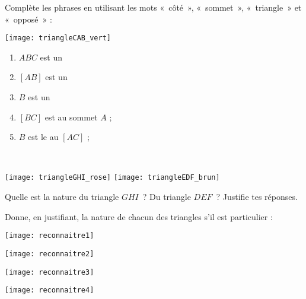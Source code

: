 

\begin{exercice}
Complète les phrases en utilisant les mots « côté », « sommet », « triangle » et « opposé » : \\[-3em]
\begin{minipage}[c]{0.26\linewidth}
 \vspace{1.5cm}
 \texttt{[image: triangleCAB\_vert]}
 \end{minipage} \hfill%
 \begin{minipage}[t]{0.68\linewidth}
  \begin{enumerate}
   \item $ABC$ est un \dotfill
   \item $[AB]$ est un  \dotfill
   \item $B$ est un  \dotfill
   \item $[BC]$ est  \dotfill au sommet $A$ ;
   \item $B$ est le  \dotfill au  \dotfill $[AC]$ ;
   \end{enumerate}
 \end{minipage} \\
\end{exercice}


\begin{exercice}
 \begin{center} \texttt{[image: triangleGHI\_rose]} \qquad \texttt{[image: triangleEDF\_brun]} \end{center}
 Quelle est la nature du triangle $GHI$ ? Du triangle $DEF$ ? Justifie tes réponses.
\end{exercice}

\begin{exercice}[Reconnaître]
Donne, en justifiant, la nature de chacun des triangles s'il est particulier :
\begin{colenumerate}{4}
 \item 
 
 \texttt{[image: reconnaitre1]}
 \item 
 
 \texttt{[image: reconnaitre2]}
 \item 
 
 \texttt{[image: reconnaitre3]}
 \item 
 
 \texttt{[image: reconnaitre4]}
 \end{colenumerate}
\end{exercice}


